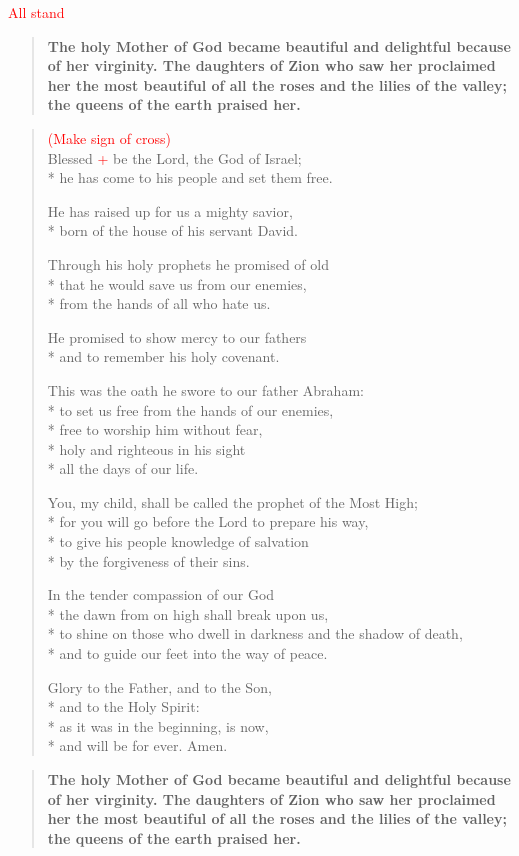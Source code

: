 \documentclass[letterpaper,14pt]{extarticle}
\newcommand{\side}[1]{\flagverse{\textcolor{red}{\textit{#1}}:}}
\newcommand{\rednote}[1]{\textcolor{red}{#1}}
\newlength{\oldindent}
\newcommand{\antiphon}[2]{
	\setlength{\oldindent}{\vindent}
	\setlength{\vindent}{0em}
	\begin{verse}
	\side{#1} \textbf{#2}
	\end{verse}
	\setlength{\vindent}{\oldindent}
}
\begin{document}
\rednote{All stand}
\antiphon{Leader}{The holy Mother of God became beautiful and delightful because of her virginity.  The daughters of Zion who saw her proclaimed her the most beautiful of all the roses and the lilies of the valley; the queens of the earth praised her.}
\begin{verse}
\rednote{(Make sign of cross)}\\
\side{All} Blessed \rednote{+} be the Lord, the God of Israel; \\*
he has come to his people and set them free.

He has raised up for us a mighty savior, \\*
born of the house of his servant David.

Through his holy prophets he promised of old \\*
  that he would save us from our enemies, \\*
  from the hands of all who hate us.

He promised to show mercy to our fathers \\*
and to remember his holy covenant.

This was the oath he swore to our father Abraham: \\*
to set us free from the hands of our enemies, \\*
free to worship him without fear, \\*
holy and righteous in his sight \\*
   all the days of our life.

You, my child, shall be called the prophet of the Most High; \\*
for you will go before the Lord to prepare his way, \\*
to give his people knowledge of salvation \\*
by the forgiveness of their sins.

In the tender compassion of our God \\*
the dawn from on high shall break upon us, \\*
to shine on those who dwell in darkness and the shadow of death, \\*
and to guide our feet into the way of peace.

Glory to the Father, and to the Son, \\*
and to the Holy Spirit: \\*
as it was in the beginning, is now, \\*
and will be for ever. Amen.
\end{verse}
\antiphon{All}{The holy Mother of God became beautiful and delightful because of her virginity.  The daughters of Zion who saw her proclaimed her the most beautiful of all the roses and the lilies of the valley; the queens of the earth praised her.}
\end{document}
